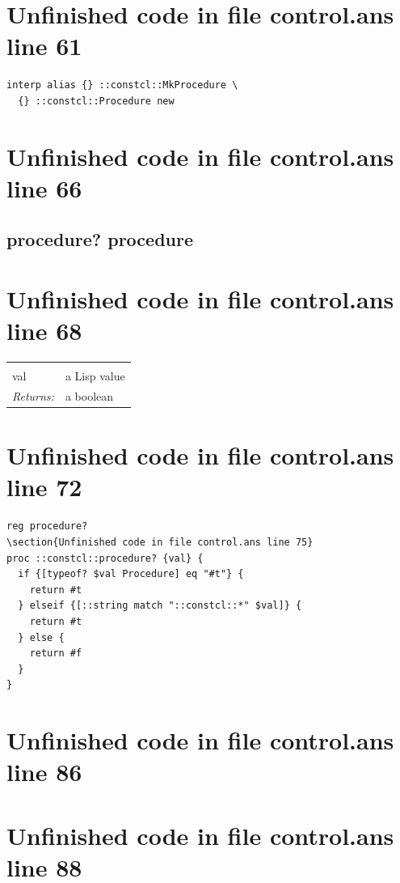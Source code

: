 \documentclass[twoside,9pt]{report}
\begin{document}
\section{Unfinished code in file control.ans line 61}
\begin{lstlisting}
interp alias {} ::constcl::MkProcedure \
  {} ::constcl::Procedure new
\end{lstlisting}
\section{Unfinished code in file control.ans line 66}
\subsection{procedure? procedure}
\label{procedure?-procedure}
\section{Unfinished code in file control.ans line 68}
\noindent\begin{tabular}{ |p{1.9cm} p{8cm}| }
\hline
\rowcolor[HTML]{CCCCCC} \multicolumn{2}{|l|}{\bf procedure? (public)} \\
val & a Lisp value \\
\textit{Returns:} & a boolean \\
\hline
\end{tabular}
\section{Unfinished code in file control.ans line 72}
\begin{lstlisting}
reg procedure?
\section{Unfinished code in file control.ans line 75}
proc ::constcl::procedure? {val} {
  if {[typeof? $val Procedure] eq "#t"} {
    return #t
  } elseif {[::string match "::constcl::*" $val]} {
    return #t
  } else {
    return #f
  }
}
\end{lstlisting}
\section{Unfinished code in file control.ans line 86}
\section{Unfinished code in file control.ans line 88}
\end{document}
